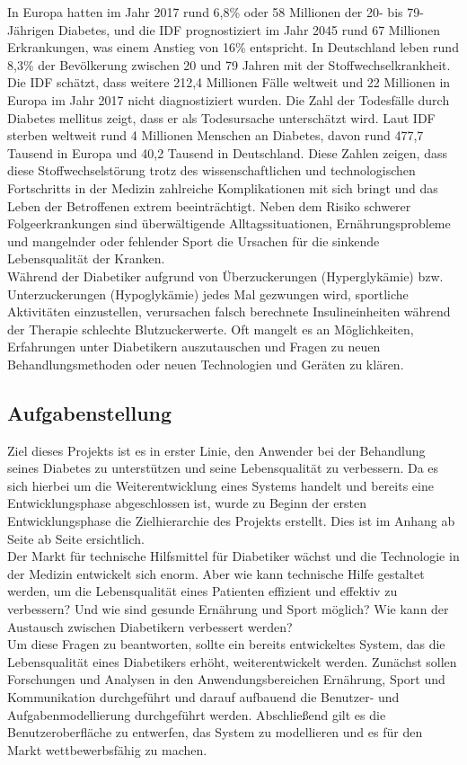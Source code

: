 	In Europa hatten im Jahr 2017 rund 6,8\% oder 58 Millionen der 20- bis 79-Jährigen Diabetes, und die IDF prognostiziert im Jahr 2045 rund 67 Millionen Erkrankungen, was einem Anstieg von 16\% entspricht. In Deutschland leben rund 8,3\% der Bevölkerung zwischen 20 und 79 Jahren mit der Stoffwechselkrankheit. Die IDF schätzt, dass weitere 212,4 Millionen Fälle weltweit und 22 Millionen in Europa im Jahr 2017 nicht diagnostiziert wurden.\cite[S. 110 ff.]{IDF} Die Zahl der Todesfälle durch Diabetes mellitus zeigt, dass er als Todesursache unterschätzt wird. Laut IDF sterben weltweit rund 4 Millionen Menschen an Diabetes, davon rund 477,7 Tausend in Europa und 40,2 Tausend in Deutschland.\cite[S. 46]{IDF} Diese Zahlen zeigen, dass diese Stoffwechselstörung trotz des wissenschaftlichen und technologischen Fortschritts in der Medizin zahlreiche Komplikationen mit sich bringt und das Leben der Betroffenen extrem beeinträchtigt. Neben dem Risiko schwerer Folgeerkrankungen sind überwältigende Alltagssituationen, Ernährungsprobleme und mangelnder oder fehlender Sport die Ursachen für die sinkende Lebensqualität der Kranken.\\
	Während der Diabetiker aufgrund von Überzuckerungen (Hyperglykämie) bzw. Unterzuckerungen (Hypoglykämie) jedes Mal gezwungen wird, sportliche Aktivitäten einzustellen, verursachen falsch berechnete Insulineinheiten während der Therapie schlechte Blutzuckerwerte. Oft mangelt es an Möglichkeiten, Erfahrungen unter Diabetikern auszutauschen und Fragen zu neuen Behandlungsmethoden oder neuen Technologien und Geräten zu klären.
\subsection{Aufgabenstellung}
	Ziel dieses Projekts ist es in erster Linie, den Anwender bei der Behandlung seines Diabetes zu unterstützen und seine Lebensqualität zu verbessern. Da es sich hierbei um die Weiterentwicklung eines Systems handelt und bereits eine Entwicklungsphase abgeschlossen ist, wurde zu Beginn der ersten Entwicklungsphase die Zielhierarchie des Projekts erstellt. Dies ist im Anhang ab Seite ab Seite \pageref{section:Zielhierarchie} ersichtlich. \\
	Der Markt für technische Hilfsmittel für Diabetiker wächst und die Technologie in der Medizin entwickelt sich enorm. Aber wie kann technische Hilfe gestaltet werden, um die Lebensqualität eines Patienten effizient und effektiv zu verbessern? Und wie sind gesunde Ernährung und Sport möglich? Wie kann der Austausch zwischen Diabetikern verbessert werden?\\
	Um diese Fragen zu beantworten, sollte ein bereits entwickeltes System, das die Lebensqualität eines Diabetikers erhöht, weiterentwickelt werden. Zunächst sollen Forschungen und Analysen in den Anwendungsbereichen \glqq Ernährung\grqq{}, \glqq Sport\grqq{} und \glqq Kommunikation\grqq{} durchgeführt und darauf aufbauend die Benutzer- und Aufgabenmodellierung durchgeführt werden. Abschließend gilt es die Benutzeroberfläche zu entwerfen, das System zu modellieren und es für den Markt wettbewerbsfähig zu machen.
